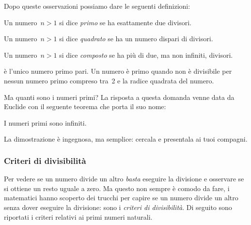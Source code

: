 Dopo queste osservazioni possiamo dare le seguenti definizioni:

\begin{definizione}
 Un numero~\(n>1\) si dice \emph{primo} se ha esattamente due divisori. 
\end{definizione}

\begin{definizione}
 Un numero~\(n>1\) si dice \emph{quadrato} se ha un numero dispari di 
divisori. 
\end{definizione}

\begin{definizione}
 Un numero~\(n>1\) si dice \emph{composto} se ha più di due, ma non infiniti, 
 divisori. 
\end{definizione}


 è l'unico numero primo pari.
\vspace{-1em}
\osservazione Un numero è primo quando non è divisibile per nessun numero 
primo compreso tra~2 e la radice quadrata del numero.

\vspace{1em}
Ma quanti sono i numeri primi? La risposta a questa domanda venne data da 
Euclide con il seguente teorema che porta il suo nome:

\begin{teorema}[di Euclide]
I numeri primi sono infiniti.
\end{teorema}

La dimostrazione è ingegnosa, ma semplice: cercala e presentala ai tuoi 
compagni.


\subsubsection{Criteri di divisibilità}
\label{sec:01_divisibilita}

Per vedere se un numero divide un altro \emph{basta} eseguire la 
divisione e osservare se si ottiene un resto uguale a zero. 
Ma questo non sempre è comodo da fare, i matematici hanno scoperto dei
trucchi per capire se un numero divide un altro senza dover eseguire 
la divisione: sono i \emph{criteri di divisibilità}. 
Di seguito sono riportati i criteri relativi ai primi numeri naturali.


